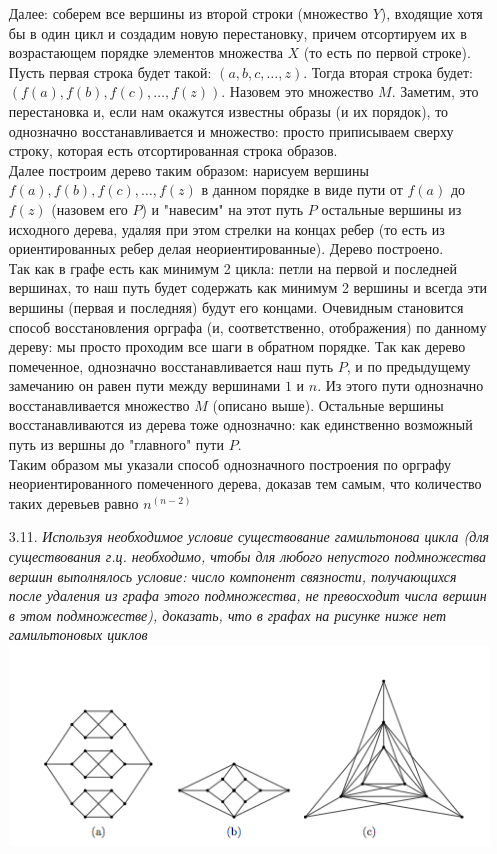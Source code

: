 \documentclass[10pt,a4paper]{article}
\begin{document}
\begin{enumerate}
	Далее: соберем все вершины из второй строки (множество $Y$), входящие хотя бы в один цикл и создадим новую перестановку, причем отсортируем их в возрастающем порядке элементов множества $X$ (то есть по первой строке). Пусть первая строка будет такой: $(a, b, c, \ldots, z)$. Тогда вторая строка будет: $(f(a), f(b), f(c), \ldots, f(z))$. Назовем это множество $M$. Заметим, это перестановка и, если нам окажутся известны образы (и их порядок), то однозначно восстанавливается и множество: просто приписываем сверху строку, которая есть отсортированная строка образов. \\
	Далее построим дерево таким образом: нарисуем вершины $f(a), f(b), f(c), \ldots, f(z)$ в данном порядке в виде пути от $f(a)$ до $f(z)$ (назовем его $P$) и "навесим" на этот путь $P$ остальные вершины из исходного дерева, удаляя при этом стрелки на концах ребер (то есть из ориентированных ребер делая неориентированные). Дерево построено.\\
	Так как в графе есть как минимум 2 цикла: петли на первой и последней вершинах, то наш путь будет содержать как минимум 2 вершины и всегда эти вершины (первая и последняя) будут его концами.
	Очевидным становится способ восстановления орграфа (и, соответственно, отображения) по данному дереву: мы просто проходим все шаги в обратном порядке. Так как дерево помеченное, однозначно восстанавливается наш путь $P$, и по предыдущему замечанию он равен пути между вершинами $1$ и $n$. Из этого пути однозначно восстанавливается множество $M$ (описано выше). Остальные вершины восстанавливаются из дерева тоже однозначно: как единственно возможный путь из вершны до "главного" пути $P$.\\
	Таким образом мы указали способ однозначного построения по орграфу неориентированного помеченного дерева, доказав тем самым, что количество таких деревьев равно $n^{(n-2)}$
	\item[3.11.] \textit{Используя необходимое условие существование гамильтонова цикла (для существования г.ц. необходимо, чтобы для любого непустого подмножества вершин выполнялось условие: число компонент связности, получающихся после удаления из графа этого подмножества, не превосходит числа вершин в этом подмножестве), доказать, что в графах на рисунке ниже нет гамильтоновых циклов}\\
	\includegraphics[keepaspectratio]{1.png}\\

\end{enumerate}
\end{document}
